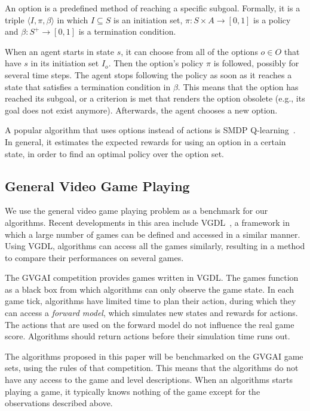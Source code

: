 An option is a predefined method of reaching a specific subgoal. Formally, it is
a triple $\langle I, \pi, \beta\rangle$ in which $I \subseteq S$ is an
initiation set, $\pi: S \times A \rightarrow [0, 1]$ is a policy and $\beta: S^+
\rightarrow[0,1]$ is a termination condition.

When an agent starts in state $s$, it can choose from all of the options $o \in
O$ that have $s$ in its initiation set $I_o$. Then the option's policy $\pi$ is
followed, possibly for several time steps. The agent stops following the policy
as soon as it reaches a state that satisfies a termination condition in $\beta$.
This means that the option has reached its subgoal, or a criterion is met that
renders the option obsolete (e.g., its goal does not exist anymore).
Afterwards, the agent chooses a new option.

A popular algorithm that uses options instead of actions is SMDP
Q-learning~\cite{sutton1999between}. In general, it estimates the expected
rewards for using an option in a certain state, in order to find an optimal
policy over the option set.

\subsection{General Video Game Playing}
\label{subsec:vgdl}
We use the general video game playing problem as a benchmark for our algorithms.
Recent developments in this area include VGDL~\cite{schaul2013video}, a
framework in which a large number of games can be defined and accessed in a
similar manner.  Using VGDL, algorithms can access all the games similarly,
resulting in a method to compare their performances on several games.

The GVGAI competition provides games written in VGDL\@.  The games function as a
black box from which algorithms can only observe the game state. In each game
tick, algorithms have limited time to plan their action, during which they can
access a \emph{forward model}, which simulates new states and rewards for
actions.  The actions that are used on the forward model do not influence the
real game score.  Algorithms should return actions before their simulation time
runs out.

The algorithms proposed in this paper will be benchmarked on the GVGAI game
sets, using the rules of that competition. This means that the algorithms do not
have any access to the game and level descriptions. When an algorithms starts
playing a game, it typically knows nothing of the game except for the
observations described above.
